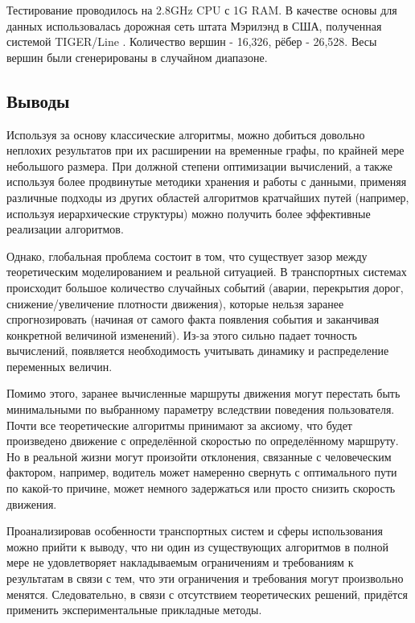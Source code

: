 \documentclass[12pt]{article}
\begin{document}
Тестирование проводилось на 2.8GHz CPU с 1G RAM. В качестве основы для данных использовалась дорожная сеть штата Мэрилэнд в США, полученная системой TIGER/Line \cite{tiger}. Количество вершин - 16,326, рёбер - 26,528. Весы вершин были сгенерированы в случайном диапазоне. 

\subsection{Выводы}

Используя за основу классические алгоритмы, можно добиться довольно неплохих результатов при их расширении на временные графы, по крайней мере небольшого размера. При должной степени оптимизации вычислений, а также используя более продвинутые методики хранения и работы с данными, применяя различные подходы из других областей алгоритмов кратчайших путей (например, используя иерархические структуры) можно получить более эффективные реализации алгоритмов. 

Однако, глобальная проблема состоит в том, что существует зазор между теоретическим моделированием и реальной ситуацией. В транспортных системах происходит большое количество случайных событий (аварии, перекрытия дорог, снижение/увеличение плотности движения), которые нельзя заранее спрогнозировать (начиная от самого факта появления события и заканчивая конкретной величиной изменений). Из-за этого сильно падает точность вычислений, появляется необходимость учитывать динамику и распределение переменных величин.

Помимо этого, заранее вычисленные маршруты движения могут перестать быть минимальными по выбранному параметру вследствии поведения пользователя. Почти все теоретические алгоритмы принимают за аксиому, что будет произведено движение с определённой скоростью по определённому маршруту. Но в реальной жизни могут произойти отклонения, связанные с человеческим фактором, например, водитель может намеренно свернуть с оптимального пути по какой-то причине, может немного задержаться или просто снизить скорость движения.  

Проанализировав особенности транспортных систем и сферы использования можно прийти к выводу, что ни один из существующих алгоритмов в полной мере не удовлетворяет накладываемым ограничениям и требованиям к результатам в связи с тем, что эти ограничения и требования могут произвольно менятся. Следовательно, в связи с отсутствием теоретических решений, придётся применить экспериментальные прикладные методы.
\end{document}
